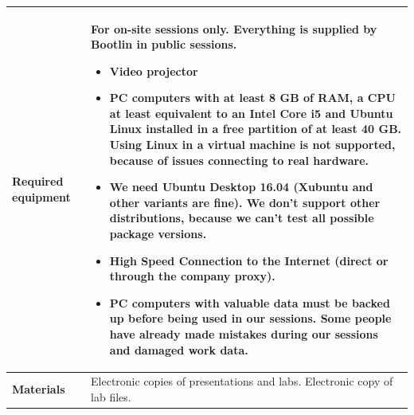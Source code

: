 \documentclass[a4paper,12pt,obeyspaces,spaces,hyphens]{article}
\begin{document}
{  \begin{tabularx}{\textwidth}{|g|h|}
    {\bf Required equipment} &
    {\bf For on-site sessions only.}
    \newline Everything is supplied by Bootlin in public
    sessions.
    \begin{itemize}
    \item Video projector
    \item PC computers with at least 8 GB of RAM, a CPU at least
      equivalent to an Intel Core i5 and Ubuntu Linux
    installed in a {\bf free partition of at least 40 GB. Using Linux
      in a virtual machine is not supported}, because of issues
    connecting to real hardware.
    \item We need Ubuntu Desktop 16.04 (Xubuntu and
    other variants are fine). We don't support other
    distributions, because we can't test all possible package versions.
    \item {\bf High Speed Connection to the Internet} (direct or through the
    company proxy).
    \item {\bf PC computers with valuable data must be backed up}
    before being used in our sessions.  Some people have already made
    mistakes during our sessions and damaged work data.
    \end{itemize} \\
    \hline

    {\bf Materials} & Electronic copies of presentations and
    labs.
    \newline Electronic copy of lab files.\\
    \hline

\end{tabularx}}
\normalsize
\end{document}
